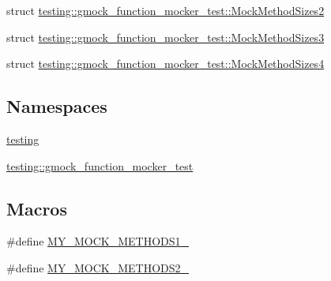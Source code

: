 \begin{DoxyCompactItemize}
\item 
struct \mbox{\hyperlink{structtesting_1_1gmock__function__mocker__test_1_1_mock_method_sizes2}{testing\+::gmock\+\_\+function\+\_\+mocker\+\_\+test\+::\+Mock\+Method\+Sizes2}}
\item 
struct \mbox{\hyperlink{structtesting_1_1gmock__function__mocker__test_1_1_mock_method_sizes3}{testing\+::gmock\+\_\+function\+\_\+mocker\+\_\+test\+::\+Mock\+Method\+Sizes3}}
\item 
struct \mbox{\hyperlink{structtesting_1_1gmock__function__mocker__test_1_1_mock_method_sizes4}{testing\+::gmock\+\_\+function\+\_\+mocker\+\_\+test\+::\+Mock\+Method\+Sizes4}}
\end{DoxyCompactItemize}
\subsection*{Namespaces}
\begin{DoxyCompactItemize}
\item 
 \mbox{\hyperlink{namespacetesting}{testing}}
\item 
 \mbox{\hyperlink{namespacetesting_1_1gmock__function__mocker__test}{testing\+::gmock\+\_\+function\+\_\+mocker\+\_\+test}}
\end{DoxyCompactItemize}
\subsection*{Macros}
\begin{DoxyCompactItemize}
\item 
\#define \mbox{\hyperlink{googletest-master_2googlemock_2test_2gmock-function-mocker__test_8cc_a9ae68063487fddb9f678e66728fae155}{M\+Y\+\_\+\+M\+O\+C\+K\+\_\+\+M\+E\+T\+H\+O\+D\+S1\+\_\+}}
\item 
\#define \mbox{\hyperlink{googletest-master_2googlemock_2test_2gmock-function-mocker__test_8cc_ac36252ad7584222cebc036d56465d652}{M\+Y\+\_\+\+M\+O\+C\+K\+\_\+\+M\+E\+T\+H\+O\+D\+S2\+\_\+}}
\end{DoxyCompactItemize}
